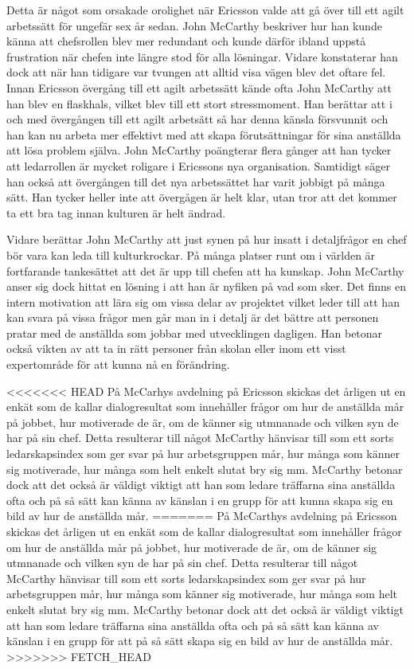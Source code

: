 Detta är något som orsakade orolighet när Ericsson valde att gå över till ett agilt arbetssätt för ungefär sex år sedan. John McCarthy beskriver hur han kunde känna att chefsrollen blev mer redundant och kunde därför ibland uppstå frustration när chefen inte längre stod för alla lösningar. Vidare konstaterar han dock att när han tidigare var tvungen att alltid visa vägen blev det oftare fel. Innan Ericsson övergång till ett agilt arbetssätt kände ofta John McCarthy att han blev en flaskhals, vilket blev till ett stort stressmoment. Han berättar att i och med övergången till ett agilt arbetsätt så har denna känsla försvunnit och han kan nu arbeta mer effektivt med att skapa förutsättningar för sina anställda att lösa problem själva. John McCarthy poängterar flera gånger att han tycker att ledarrollen är mycket roligare i Ericssons nya organisation. Samtidigt säger han också att övergången till det nya arbetssättet har varit jobbigt på många sätt. Han tycker heller inte att övergågen är helt klar, utan tror att det kommer ta ett bra tag innan kulturen är helt ändrad.

Vidare berättar John McCarthy att just synen på hur insatt i detaljfrågor en chef bör vara kan leda till kulturkrockar. På många platser runt om i världen är fortfarande tankesättet att det är upp till chefen att ha kunskap. John McCarthy anser sig dock hittat en lösning i att han är nyfiken på vad som sker. Det finns en intern motivation att lära sig om vissa delar av projektet vilket leder till att han kan svara på vissa frågor men går man in i detalj är det bättre att personen pratar med de anställda som jobbar med utvecklingen dagligen. Han betonar också vikten av att ta in rätt personer från skolan eller inom ett visst expertområde för att kunna nå en förändring.

<<<<<<< HEAD
På McCarhys avdelning på Ericsson skickas det årligen ut en enkät som de kallar dialogresultat som innehåller frågor om hur de anställda mår på jobbet, hur motiverade de är, om de känner sig utmnanade och vilken syn de har på sin chef. Detta resulterar till något McCarthy hänvisar till som ett sorts ledarskapsindex som ger svar på hur arbetsgruppen mår, hur många som känner sig motiverade, hur många som helt enkelt slutat bry sig mm. McCarthy betonar dock att det också är väldigt viktigt att han som ledare träffarna sina anställda ofta och på så sätt kan känna av känslan i en grupp för att kunna skapa sig en bild av hur de anställda mår.
=======
På McCarthys avdelning på Ericsson skickas det årligen ut en enkät som de kallar dialogresultat som innehåller frågor om hur de anställda mår på jobbet, hur motiverade de är, om de känner sig utmnanade och vilken syn de har på sin chef. Detta resulterar till något McCarthy hänvisar till som ett sorts ledarskapsindex som ger svar på hur arbetsgruppen mår, hur många som känner sig motiverade, hur många som helt enkelt slutat bry sig mm. McCarthy betonar dock att det också är väldigt viktigt att han som ledare träffarna sina anställda ofta och på så sätt kan känna av känslan i en grupp för att på så sätt skapa sig en bild av hur de anställda mår.
>>>>>>> FETCH_HEAD

